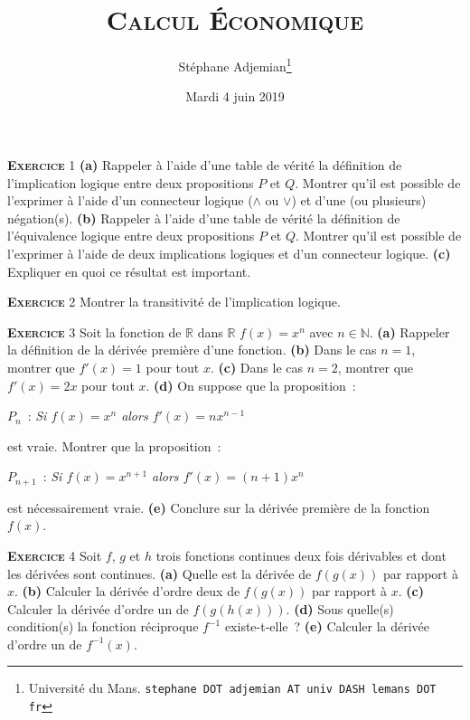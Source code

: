 \documentclass[10pt,a4paper,notitlepage,twocolumn]{article}
\newcommand{\exercise}[1]{\textsc{\textbf{Exercice}} #1}
\newcommand{\question}[1]{\textbf{(#1)}}
\begin{document}
\title{\textsc{Calcul Économique}}
\author{Stéphane Adjemian\thanks{Université du Mans. \texttt{stephane DOT adjemian AT univ DASH lemans DOT fr}}}
\date{Mardi 4 juin 2019}

\maketitle

\thispagestyle{empty}

\exercise{1} \question{a} Rappeler à l'aide d'une table de vérité la
définition de l'implication logique entre deux propositions $P$ et
$Q$. Montrer qu'il est possible de l'exprimer à l'aide d'un connecteur
logique ($\land$ ou $\lor$) et d'une (ou plusieurs)
négation(s). \question{b} Rappeler à l'aide d'une table de vérité la
définition de l'équivalence logique entre deux propositions $P$ et
$Q$. Montrer qu'il est possible de l'exprimer à l'aide de deux
implications logiques et d'un connecteur logique. \question{c} Expliquer
en quoi ce résultat est important.

\bigskip
  
\exercise{2} Montrer la transitivité de l'implication logique.

\bigskip

\exercise{3} Soit la fonction de $\mathbb R$ dans $\mathbb R$ $f(x) = x^n$ avec $n\in\mathbb N$. \question{a} Rappeler la définition de la dérivée première d'une fonction. \question{b} Dans le cas $n=1$, montrer que $f'(x) = 1$ pour tout $x$. \question{c} Dans le cas $n=2$, montrer que $f'(x) = 2x$ pour tout $x$. \question{d} On suppose que la proposition :
\begin{center}
$P_{n}$ : \textit{Si $f(x)=x^{n}$ alors $f'(x) = n x^{n-1}$}  
\end{center}
est vraie. Montrer que la proposition :
\begin{center}
$P_{n+1}$ : \textit{Si $f(x)=x^{n+1}$ alors $f'(x) = (n+1) x^{n}$}  
\end{center}
 est nécessairement vraie. \question{e} Conclure sur la dérivée première de la fonction $f(x)$.

\bigskip

\exercise{4} Soit $f$, $g$ et $h$ trois fonctions continues deux fois dérivables et dont les dérivées sont continues. \question{a} Quelle est la dérivée de $f(g(x))$ par rapport à $x$. \question{b} Calculer la dérivée d'ordre deux de $f(g(x))$ par rapport à $x$. \question{c} Calculer la dérivée d'ordre un de $f(g(h(x)))$. \question{d} Sous quelle(s) condition(s) la fonction réciproque $f^{-1}$ existe-t-elle ? \question{e} Calculer la dérivée d'ordre un de $f^{-1}(x)$.
\end{document}

